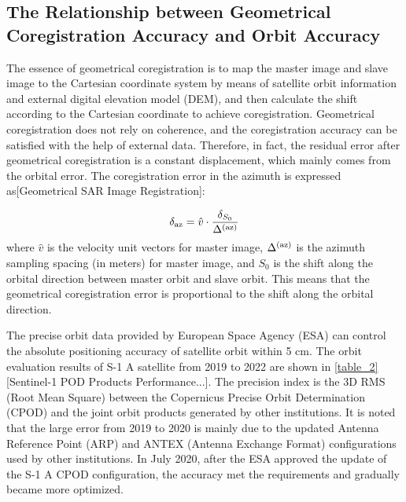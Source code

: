 \documentclass[a4paper,fleqn]{cas-dc}
\begin{document}
\subsection{The Relationship between Geometrical Coregistration Accuracy and Orbit Accuracy}
The essence of geometrical coregistration is to map the master image and slave image to the Cartesian coordinate system by means of satellite orbit information and external digital elevation model (DEM), and then calculate the shift according to the Cartesian coordinate to achieve coregistration. Geometrical coregistration does not rely on coherence, and the coregistration accuracy can be satisfied with the help of external data. Therefore, in fact, the residual error after geometrical coregistration is a constant displacement, which mainly comes from the orbital error. The coregistration error in the azimuth is expressed as[Geometrical SAR Image Registration]: \par
\begin{equation}
    \delta_{\rm az} = \hat{v} \cdot \frac{\delta_{S_0}}{\Delta^{({\rm az})}}
\end{equation}
\noindent where $\hat{v}$ is the velocity unit vectors for master image, $\Delta^{({\rm az})}$ is the azimuth sampling spacing (in meters) for master image, and $S_0$ is the shift along the orbital direction between master orbit and slave orbit. This means that the geometrical coregistration error is proportional to the shift along the orbital direction. \par
The precise orbit data provided by European Space Agency (ESA) can control the absolute positioning accuracy of satellite orbit within 5 cm. The orbit evaluation results of S-1 A satellite from 2019 to 2022 are shown in \ref{table_2}[Sentinel-1 POD Products Performance...]. The precision index is the 3D RMS (Root Mean Square) between the Copernicus Precise Orbit Determination (CPOD) and the joint orbit products generated by other institutions. It is noted that the large error from 2019 to 2020 is mainly due to the updated Antenna Reference Point (ARP) and ANTEX (Antenna Exchange Format) configurations used by other institutions. In July 2020, after the ESA approved the update of the S-1 A CPOD configuration, the accuracy met the requirements and gradually became more optimized. \par
\end{document}
